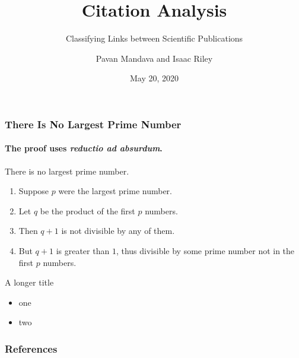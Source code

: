 \documentclass[
  xcolor={svgnames},
  hyperref={colorlinks,citecolor=DeepPink4,linkcolor=DarkRed,urlcolor=DarkBlue}
  ]{beamer}
\title[Largest Prime Number?] %
{Citation Analysis}
\subtitle{Classifying Links between Scientific Publications}
\author[tmip, hieutt] %
{Pavan Mandava and Isaac Riley}
\institute[Universities Here and There] %
{
  \inst{1}%
  Computational Linguistics, M.Sc.\\
  \and
  \inst{2}%
  Computational Linguistics, M.Sc.\\
}
\date[] %
{May 20, 2020}
\begin{document}
\begin{frame}
\titlepage
\end{frame}


\begin{frame}
\frametitle{There Is No Largest Prime Number}
\framesubtitle{The proof uses \textit{reductio ad absurdum}.}
\begin{theorem}
There is no largest prime number. \end{theorem}
\begin{enumerate}
\item<1-| alert@1> Suppose $p$ were the largest prime number.
\item<2-> Let $q$ be the product of the first $p$ numbers.
\item<3-> Then $q+1$ is not divisible by any of them.
\item<1-> But $q + 1$ is greater than $1$, thus divisible by some prime
number not in the first $p$ numbers.
\end{enumerate}
\end{frame}

\begin{frame}{A longer title}
\begin{itemize}
\item one
\item two
\end{itemize}
\end{frame}


\begin{frame}[allowframebreaks]
   \frametitle{References}
   
   
\end{frame}
\end{document}
